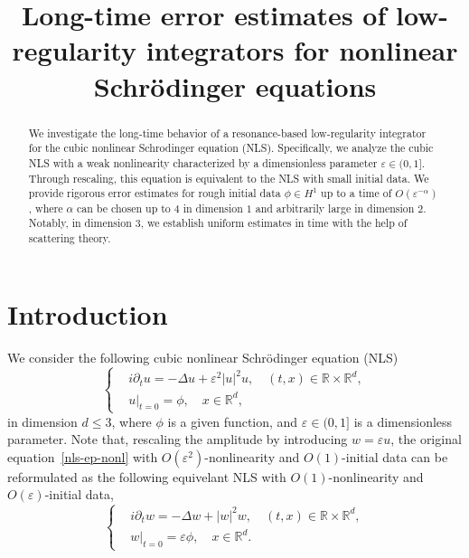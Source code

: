\documentclass[10pt,a4paper]{article}
\title{Long-time error estimates of low-regularity integrators for nonlinear
Schr\"odinger equations}
\date{}
\begin{document}
  \maketitle
  \begin{abstract}
    We investigate the long-time behavior of a resonance-based low-regularity 
    integrator for the cubic nonlinear Schrodinger equation (NLS). Specifically, 
    we analyze the cubic NLS with a weak nonlinearity characterized by a 
    dimensionless parameter \(\varepsilon \in (0,1]\). Through rescaling, this 
    equation is equivalent to the NLS with small initial data. We provide rigorous
    error estimates for rough initial data \(\phi \in H^1\) up to a time of \(O(\varepsilon^{-\alpha})\), 
    where \(\alpha\) can be chosen up to \(4\) in dimension \(1\) and arbitrarily 
    large in dimension \(2\). Notably, in dimension \(3\), we establish uniform 
    estimates in time with the help of scattering theory.
  \end{abstract}

  \section{Introduction}
  We consider the following cubic nonlinear Schr\"{o}dinger equation (NLS)
  \begin{equation}\label{nls-ep-nonl} %
    \left\{
    \begin{aligned}
      & i\partial_t u = -\Delta u + \varepsilon^2 |u|^2 u, \quad (t,x) \in
      \mathbb R\times\mathbb R^d, \\
      & u|_{t=0} = \phi, \quad x \in \mathbb R^d,
    \end{aligned}
    \right.
  \end{equation}
  in dimension \( d \leq 3 \), where \(\phi\) is a given function, and \(
  \varepsilon \in (0,1] \) is a dimensionless parameter. %
  Note that, rescaling the amplitude by introducing \(w = \varepsilon u\),
  the original equation~\eqref{nls-ep-nonl} with \(O(\varepsilon^2)\)-nonlinearity and 
  \(O(1)\)-initial data can be reformulated as the following equivelant NLS
  with \(O(1)\)-nonlinearity and \(O(\varepsilon)\)-initial data,
  \begin{equation}%
    \left\{
    \begin{aligned}
      & i\partial_t w = -\Delta w + |w|^2 w, \quad (t,x) \in
      \mathbb R\times\mathbb R^d, \\
      & w|_{t=0} = \varepsilon \phi, \quad x \in \mathbb R^d.
    \end{aligned}
    \right.
  \end{equation}
\end{document}
